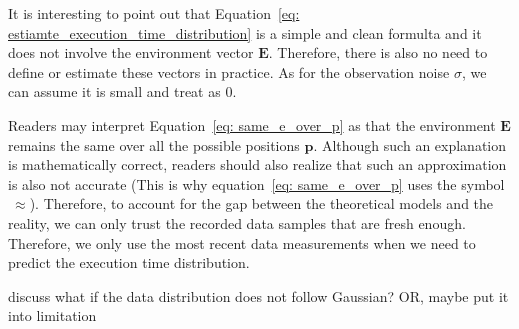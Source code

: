     It is interesting to point out that Equation~\eqref{eq: estiamte_execution_time_distribution} is a simple and clean formulta and it does not involve the environment vector $\textbf{E}$. Therefore, there is also no need to define or estimate these vectors in practice. As for the  observation noise $\sigma$, we can assume it is small and treat as 0.
    
    
    Readers may interpret Equation~\eqref{eq: same_e_over_p} as that the environment $\textbf{E}$ remains the same over all the possible positions $\textbf{p}$. Although such an explanation is mathematically correct, readers should also realize that such an approximation is also not accurate (This is why equation~\eqref{eq: same_e_over_p} uses the symbol $~\approx$). Therefore, to account for the gap between the theoretical models and the reality, we can only trust the recorded data samples that are fresh enough. Therefore, we only use the most recent data measurements when we need to predict the execution time distribution.

    \todo discuss what if the data distribution does not follow Gaussian? OR, maybe put it into limitation
	
	